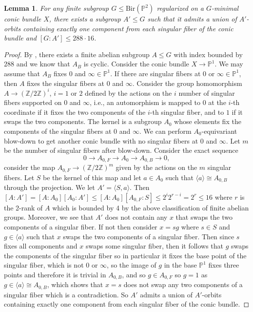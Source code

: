 \documentclass[a4paper,12pt,oneside]{amsart}
\numberwithin{equation}{section}
\newtheorem{lemma}[theorem]{Lemma}
\theoremstyle{definition}
\theoremstyle{remark}
\newcommand{\PP}{\mathbb{P}}
\newcommand{\Ptwo}{\mathbb{P}^2}
\newcommand{\Bir}{\mathrm{Bir}}
\begin{document}
\begin{lemma}
For any finite subgroup $G\leqslant \Bir(\Ptwo)$ regularized on a $G$-minimal conic bundle $X$, there exists a subgroup $A'\leqslant G$ such that it admits a union of $A'$-orbits containing exactly one component from each singular fiber of the conic bundle and $[G:A'] \leq 288\cdot 16$.
\end{lemma}

\begin{proof}
By \cite[Proposition 1.2.3]{prok17}, there exists a finite abelian subgroup $A\leqslant G$ with index bounded by $288$ and we know that $A_B$ is cyclic. Consider the conic bundle $X\to \PP^1$. We may assume that $A_B$ fixes $0$ and $\infty\in\PP^1$. If there are singular fibers at $0$ or $\infty\in \PP^1$, then $A$ fixes the singular fibers at $0$ and $\infty$. Consider the group homomorphism $A \to (\mathbb{Z}/2\mathbb{Z})^i$, $i=1$ or $2$ defined by the actions on the $i$ number of singular fibers supported on $0$ and $\infty$, i.e., an automorphism is mapped to $0$ at the $i$-th coordinate if it fixes the two components of the $i$-th singular fiber, and to $1$ if it swaps the two components. The kernel is a subgroup $A_0$ whose elements fix the components of the singular fibers at $0$ and $\infty$. We can perform $A_0$-equivariant blow-down to get another conic bundle with no singular fibers at $0$ and $\infty$. Let $m$ be the number of singular fibers after blow-down.
Consider the exact sequence $$0\to A_{0,F}\to A_0\to A_{0,B}\to 0,$$ consider the map $A_{0,F}\to (\mathbb Z/2\mathbb Z)^m$ given by the actions on the $m$ singular fibers. Let $S$ be the kernel of this map and let $a\in A_0$ such that $\langle a\rangle \cong A_{0,B}$ through the projection. We let $A'= \langle S, a\rangle$. Then $[A:A']=[A:A_0][A_0:A'] \leq [A:A_0][A_{0,F}:S]\leq 2^i 2^{r-i}  = 2^r \leq 16$ where $r$ is the 2-rank of $A$ which is bounded by 4 by the above classification of finite abelian groups. Moreover, we see that $A'$ does not contain any $x$ that swaps the two components of a singular fiber. If not then consider $x=sg$ where $s\in S$ and $g\in\langle a \rangle$ such that $x$ swaps the two components of a singular fiber. Then since $s$ fixes all components and $x$ swaps some singular fiber, then it follows that $g$ swaps the components of the singular fiber so in particular it fixes the base point of the singular fiber, which is not $0$ or $\infty$, so the image of $g$ in the base $\PP^1$ fixes three points and therefore it is trivial in $A_{0,B}$, and so $g\in A_{0,F}$ so $g = 1$ as $g\in \langle a \rangle \cong A_{0,B}$, which shows that $x=s$ does not swap any two components of a singular fiber which is a contradiction. So $A'$ admits a union of $A'$-orbits containing exactly one component from each singular fiber of the conic bundle.
\end{proof}
\end{document}

